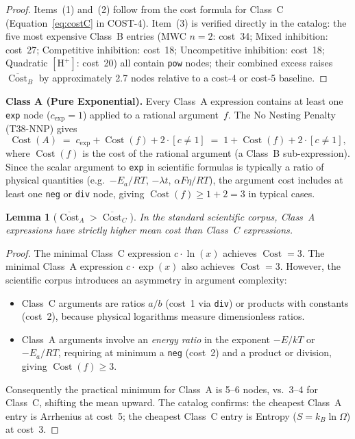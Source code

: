 \documentclass[12pt,a4paper]{article}
\newtheorem{lemma}[theorem]{Lemma}
\theoremstyle{definition}
\newcommand{\Cost}{\operatorname{Cost}}
\newcommand{\cexp}{c_{\mathrm{exp}}}
\begin{document}
\begin{proof}
Items~(1) and~(2) follow from the cost formula for Class~C
(Equation~\eqref{eq:costC} in COST-4).
Item~(3) is verified directly in the catalog: the five most expensive
Class~B entries (MWC $n=2$: cost~34; Mixed inhibition: cost~27;
Competitive inhibition: cost~18; Uncompetitive inhibition: cost~18;
Quadratic $[\mathrm{H}^+]$: cost~20) all contain \texttt{pow} nodes;
their combined excess raises $\overline{\Cost}_B$ by approximately 2.7
nodes relative to a cost-4 or cost-5 baseline.
\end{proof}

\medskip
\noindent\textbf{Class A (Pure Exponential).}
Every Class~A expression contains at least one \texttt{exp} node
($\cexp = 1$) applied to a rational argument~$f$.
The No Nesting Penalty (T38-NNP) gives
\[
  \Cost(A) \;=\; \cexp + \Cost(f) + 2 \cdot [c \neq 1]
            \;=\; 1 + \Cost(f) + 2 \cdot [c \neq 1],
\]
where $\Cost(f)$ is the cost of the rational argument (a Class~B
sub-expression).
Since the scalar argument to \texttt{exp} in scientific formulas is
typically a ratio of physical quantities (e.g.\ $-E_a/RT$,
$-\lambda t$, $\alpha F\eta / RT$), the argument cost includes at
least one \texttt{neg} or \texttt{div} node, giving
$\Cost(f) \geq 1 + 2 = 3$ in typical cases.

\begin{lemma}[$\overline{\Cost}_A > \overline{\Cost}_C$]
\label{lem:AgtC}
In the standard scientific corpus, Class~A expressions have strictly
higher mean cost than Class~C expressions.
\end{lemma}

\begin{proof}
The minimal Class~C expression $c \cdot \ln(x)$ achieves $\Cost = 3$.
The minimal Class~A expression $c \cdot \exp(x)$ also achieves
$\Cost = 3$.
However, the scientific corpus introduces an asymmetry in argument
complexity:
\begin{itemize}
  \item Class~C arguments are ratios $a/b$ (cost~1 via \texttt{div})
        or products with constants (cost~2), because physical logarithms
        measure dimensionless ratios.
  \item Class~A arguments involve an \emph{energy ratio} in the exponent
        $-E/kT$ or $-E_a/RT$, requiring at minimum a \texttt{neg}
        (cost~2) and a product or division, giving $\Cost(f) \geq 3$.
\end{itemize}
Consequently the practical minimum for Class~A is 5--6 nodes, vs.\ 3--4
for Class~C, shifting the mean upward.
The catalog confirms: the cheapest Class~A entry is Arrhenius at
cost~5; the cheapest Class~C entry is Entropy ($S = k_B \ln\Omega$)
at cost~3.
\end{proof}
\end{document}
